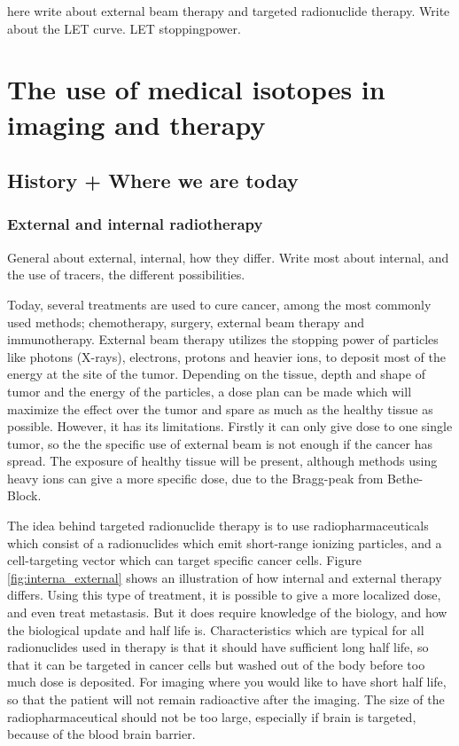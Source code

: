 \documentclass[a4paper,11pt,twoside]{book}
\begin{document}
here write about external beam therapy and targeted radionuclide therapy. 
Write about the LET curve. LET stoppingpower. 




\chapter{The use of medical isotopes in imaging and therapy}\label{Chapter:Medical_Isotopes}
\noindent


\section{History + Where we are today}

\subsection{External and internal radiotherapy }
General about external, internal, how they differ. Write most about internal, and the use of tracers, the different possibilities. 


Today, several treatments are used to cure cancer, among the most commonly used methods; chemotherapy, surgery, external beam therapy and immunotherapy.  External beam therapy utilizes the stopping power of particles like photons (X-rays), electrons, protons and heavier ions, to deposit most of the energy at the site of the tumor. Depending on the tissue, depth and shape of tumor and the energy of the particles, a dose plan can be made which will maximize the effect over the tumor and spare as much as the healthy tissue as possible. However, it has its limitations. Firstly it can only give dose to one single tumor, so the the specific use of external beam is not enough if the cancer has spread. The exposure of healthy tissue will be present, although methods using heavy ions can give a more specific dose, due to the Bragg-peak from Bethe-Block. \newline

\noindent
The idea behind targeted radionuclide therapy is to use radiopharmaceuticals which consist of a radionuclides which emit short-range ionizing particles, and a cell-targeting vector which can target specific cancer cells. Figure \ref{fig:interna_external} shows an illustration of how internal and external therapy differs. Using this type of treatment, it is possible to give a more localized dose, and even treat metastasis. But it does require knowledge of the biology, and how the biological update and half life is. Characteristics which are typical for all radionuclides used in therapy is that it should have sufficient long half life, so that it can be targeted in cancer cells but washed out of the body before too much dose is deposited. For imaging  where you would like to have short half life, so that the patient will not remain radioactive after the imaging. The size of the radiopharmaceutical should not be too large, especially if brain is targeted, because of the blood brain barrier. 
\end{document}
